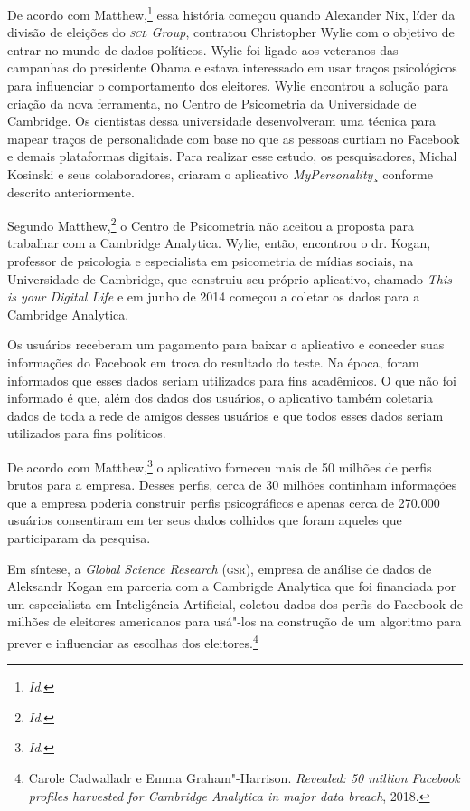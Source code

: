 De acordo com Matthew,\footnote{\textit{Id}.} essa história começou quando
Alexander Nix, líder da divisão de eleições do \textit{\textsc{scl} Group},
contratou Christopher Wylie com o objetivo de entrar no mundo de dados
políticos. Wylie foi ligado aos veteranos das campanhas do presidente
Obama e estava interessado em usar traços psicológicos para influenciar
o comportamento dos eleitores. Wylie encontrou a solução para criação da
nova ferramenta, no Centro de Psicometria da Universidade de Cambridge.
Os cientistas dessa universidade desenvolveram uma técnica para mapear
traços de personalidade com base no que as pessoas curtiam no Facebook e
demais plataformas digitais. Para realizar esse estudo, os
pesquisadores, Michal Kosinski e seus colaboradores, criaram o
aplicativo \textit{MyPersonality}¸ conforme descrito anteriormente.

Segundo Matthew,\footnote{\textit{Id}.} o Centro de Psicometria não aceitou a
proposta para trabalhar com a Cambridge Analytica. Wylie, então,
encontrou o dr. Kogan, professor de psicologia e especialista em
psicometria de mídias sociais, na Universidade de Cambridge, que
construiu seu próprio aplicativo, chamado \textit{This is your Digital
Life} e em junho de 2014 começou a coletar os dados para a Cambridge
Analytica.

Os usuários receberam um pagamento para baixar o aplicativo e conceder
suas informações do Facebook em troca do resultado do teste. Na época,
foram informados que esses dados seriam utilizados para fins acadêmicos.
O que não foi informado é que, além dos dados dos usuários, o aplicativo
também coletaria dados de toda a rede de amigos desses usuários e que
todos esses dados seriam utilizados para fins políticos.

De acordo com Matthew,\footnote{\textit{Id}.} o aplicativo forneceu mais de 50
milhões de perfis brutos para a empresa. Desses perfis, cerca de 30
milhões continham informações que a empresa poderia construir perfis
psicográficos e apenas cerca de 270.000 usuários consentiram em ter seus
dados colhidos que foram aqueles que participaram da pesquisa.

Em síntese, a \textit{Global Science Research} (\textsc{gsr}), empresa de análise
de dados de Aleksandr Kogan em parceria com a Cambrigde Analytica que
foi financiada por um especialista em Inteligência Artificial, coletou
dados dos perfis do Facebook de milhões de eleitores americanos para
usá"-los na construção de um algoritmo para prever e influenciar as
escolhas dos eleitores.\footnote{Carole Cadwalladr e Emma Graham"-Harrison. \textit{Revealed: 50 million Facebook profiles harvested for Cambridge Analytica in major data
breach}, 2018.}

